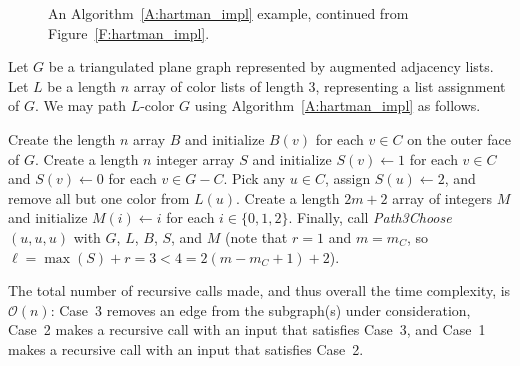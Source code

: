\documentclass[12pt,letterpaper]{article}
\theoremstyle{plain}
\theoremstyle{definition}
\theoremstyle{break}
\begin{document}
\begin{figure}
\begin{center}
\caption{An Algorithm~\ref{A:hartman_impl} example, continued from
Figure~\ref{F:hartman_impl}.}
\label{F:hartman_impl_cont}
\end{center}
\end{figure}

Let $G$ be a triangulated plane graph
represented by augmented adjacency
lists. Let $L$ be a length $n$ array of color lists of length $3$,
representing a list assignment of $G$. We may path $L$-color $G$ using
Algorithm~\ref{A:hartman_impl} as follows.

Create the length $n$ array $B$ and initialize $B(v)$
for each $v\in C$ on the outer face of $G$.
Create a length $n$ integer array
$S$ and initialize $S(v)\leftarrow 1$ for each $v\in C$ and
$S(v)\leftarrow 0$ for each $v\in G-C$. Pick any $u\in C$,
assign $S(u)\leftarrow 2$, and remove all but one color from $L(u)$.
Create a length $2m+2$ array of integers $M$ and initialize
$M(i)\leftarrow i$ for each $i\in\{0,1,2\}$.
Finally, call \emph{Path3Choose}$(u, u, u)$ with $G$, $L$,
$B$, $S$, and $M$ (note that $r=1$ and
$m=m_C$, so $\ell=\max(S)+r=3<4=2(m-m_C+1)+2$).

The total number of recursive calls made, and thus overall the
time complexity, is $\mathcal{O}(n)$:
Case~3 removes an edge
from the subgraph(s) under consideration,
Case~2 makes a recursive
call with an input that satisfies Case~3, and
Case~1 makes a recursive call
with an input that satisfies Case~2.
\end{document}

